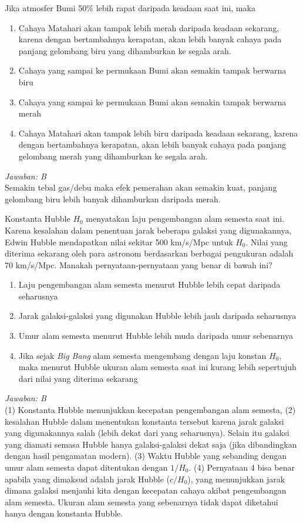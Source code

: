 \documentclass[11pt,fleqn, a4paper]{exam}
\begin{document}
\begin{questions}
\vspace{0.5cm}
\question Jika atmosfer Bumi 50\% lebih rapat daripada keadaan saat ini, maka
\begin{enumerate}
\item Cahaya Matahari akan tampak lebih merah daripada keadaan sekarang, karena dengan bertambahnya kerapatan, akan lebih banyak cahaya pada panjang gelombang biru yang dihamburkan ke segala arah.
\item Cahaya yang sampai ke permukaan Bumi akan semakin tampak berwarna biru 
\item Cahaya yang sampai ke permukaan Bumi akan semakin tampak berwarna merah 
\item Cahaya Matahari akan tampak lebih biru daripada keadaan sekarang, karena dengan bertambahnya kerapatan, akan lebih banyak cahaya pada panjang gelombang merah yang dihamburkan ke segala arah.
\end{enumerate}

\textit{Jawaban: B}\\
Semakin tebal gas/debu maka efek pemerahan akan semakin kuat, panjang gelombang biru lebih banyak dihamburkan daripada merah.


\vspace{0.5cm}
\question Konstanta Hubble $H_0$ menyatakan laju pengembangan alam semesta saat ini. Karena kesalahan dalam penentuan jarak beberapa galaksi yang digunakannya, Edwin Hubble mendapatkan nilai sekitar 500 km/s/Mpc untuk $H_0$. Nilai yang diterima sekarang oleh para astronom berdasarkan berbagai pengukuran adalah 70 km/s/Mpc. Manakah pernyataan-pernyataan yang benar di bawah ini?
\begin{enumerate}
\item Laju pengembangan alam semesta menurut Hubble lebih cepat daripada seharusnya
\item Jarak galaksi-galaksi yang digunakan Hubble lebih jauh daripada seharusnya
\item Umur alam semesta menurut Hubble lebih muda daripada umur sebenarnya
\item Jika sejak \textit{Big Bang} alam semesta mengembang dengan laju konstan $H_0$, maka menurut Hubble ukuran alam semesta saat ini kurang lebih sepertujuh dari nilai yang diterima sekarang
\end{enumerate}

\textit{Jawaban: B}\\
(1) Konstanta Hubble menunjukkan kecepatan pengembangan alam semesta, (2) kesalahan Hubble dalam menentukan konstanta tersebut karena jarak galaksi yang digunakannya salah (lebih dekat dari yang seharusnya). Selain itu galaksi yang diamati semasa Hubble hanya galaksi-galaksi dekat saja (jika dibandingkan dengan hasil pengamatan modern). (3) Waktu Hubble yang sebanding dengan umur alam semesta dapat ditentukan dengan $1/H_0$. (4) Pernyataan 4 bisa benar apabila yang dimaksud adalah jarak Hubble ($c/H_0$), yang menunjukkan jarak dimana galaksi menjauhi kita dengan kecepatan cahaya akibat pengembangan alam semesta. Ukuran alam semesta yang sebenarnya tidak dapat diketahui hanya dengan konstanta Hubble.



\end{questions}
\end{document}
